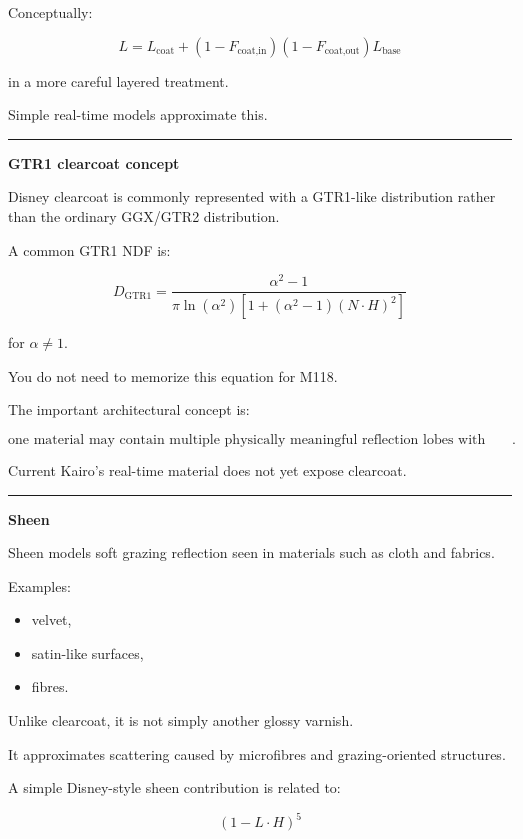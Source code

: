 Conceptually:

\[
L=
L_{\text{coat}}
+
(1-F_{\text{coat,in}})
(1-F_{\text{coat,out}})
L_{\text{base}}
\]

in a more careful layered treatment.

Simple real-time models approximate this.

\begin{center}\rule{0.5\linewidth}{0.5pt}\end{center}

\textbf{GTR1 clearcoat concept}

Disney clearcoat is commonly represented with a GTR1-like distribution rather than the ordinary GGX/GTR2 distribution.

A common GTR1 NDF is:

\[
D_{\mathrm{GTR1}}
=
\frac{
\alpha^2-1
}{
\pi
\ln(\alpha^2)
\left[
1+(\alpha^2-1)(N\cdot H)^2
\right]
}
\]

for \(\alpha\neq1\).

You do not need to memorize this equation for M118.

The important architectural concept is:

\[
\boxed{
\text{one material may contain multiple physically meaningful reflection lobes with different roughness distributions}.
}
\]

Current Kairo's real-time material does not yet expose clearcoat.

\begin{center}\rule{0.5\linewidth}{0.5pt}\end{center}

\textbf{Sheen}

Sheen models soft grazing reflection seen in materials such as cloth and fabrics.

Examples:

\begin{itemize}
\tightlist
\item
  velvet,
\item
  satin-like surfaces,
\item
  fibres.
\end{itemize}

Unlike clearcoat, it is not simply another glossy varnish.

It approximates scattering caused by microfibres and grazing-oriented structures.

A simple Disney-style sheen contribution is related to:

\[
(1-L\cdot H)^5
\]

